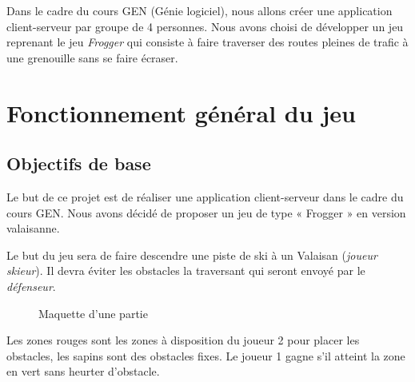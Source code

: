 \documentclass[a4paper,11pt]{article}
\begin{document}
	
	Dans le cadre du cours GEN (Génie logiciel), nous allons créer une application client-serveur par groupe de 4 personnes. Nous avons choisi de développer un jeu reprenant le jeu \textit{Frogger} qui consiste à faire traverser des routes pleines de trafic à une grenouille sans se faire écraser. 
	
	
	\section{Fonctionnement général du jeu}
	
	
	\subsection{Objectifs de base}
	Le but de ce projet est de réaliser une application client-serveur dans le cadre du cours GEN. Nous avons décidé de proposer un jeu de type « Frogger » en version valaisanne. \par
	
	Le but du jeu sera de faire descendre une piste de ski à un Valaisan (\textit{joueur skieur}). Il devra éviter les obstacles la traversant qui seront envoyé par le \textit{défenseur}.
	
	\begin{figure}[h!]
		\centering
		\caption{Maquette d'une partie}
		\label{fig:maquette}
	\end{figure}
	
	Les zones rouges sont les zones à disposition du joueur 2 pour placer les obstacles, les sapins sont des obstacles fixes. Le joueur 1 gagne s'il atteint la zone en vert sans heurter d'obstacle.
	
\end{document}
